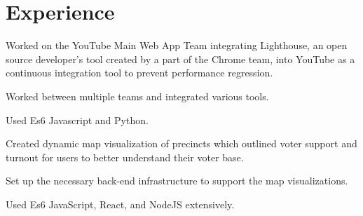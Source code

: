 \documentclass[letterpaper]{deedy-resume} %
\begin{document}
  \begin{minipage}[t]{0.66\textwidth} %


    \section{Experience}


    \vspace{\topsep} %
    \begin{tightitemize}
      \item Worked on the YouTube Main Web App Team integrating Lighthouse, an open source developer's tool created by a part of the Chrome team, into YouTube as a continuous integration tool to prevent performance regression.
      \item Worked between multiple teams and integrated various tools.
      \item Used Es6 Javascript and Python.
    \end{tightitemize}

    \sectionspace %



    \begin{tightitemize}
      \item Created dynamic map visualization of precincts which outlined voter support and turnout for users to better understand their voter base.
      \item Set up the necessary back-end infrastructure to support the map visualizations.
      \item Used Es6 JavaScript, React, and NodeJS extensively.
    \end{tightitemize}

    \sectionspace %



\end{minipage}
\end{document}
